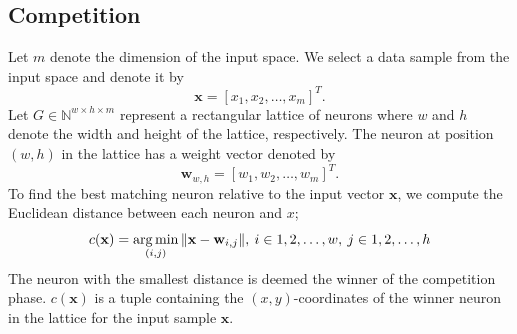 \documentclass[english]{lni}
\newcommand{\argmin}{\operatornamewithlimits{arg\,min}}
\begin{document}
\subsection{Competition}
Let $m$ denote the dimension of the input space.
We select a data sample from the input space and denote it by
\begin{equation}
    \mathbf{x} = [x_{1}, x_{2}, \hdots, x_{m}]^{T}.
\end{equation}
Let $G \in \mathbb{N}^{w \times h \times m}$ represent a rectangular lattice of neurons where $w$ and $h$ denote the width and height of the lattice, respectively.
The neuron at position $(w, h)$ in the lattice has a weight vector denoted by 
\begin{equation}
    \mathbf{w}_{w, h} = [w_{1}, w_{2}, \hdots, w_{m}]^{T}.
\end{equation}
To find the best matching neuron relative to the input vector $\mathbf{x}$, we 
compute the Euclidean distance between each neuron and $x$;
\begin{equation}
    \label{eq:min-dist}
    c(\mathbf{x}) = \argmin_{(i, j)}{\| \mathbf{x} - \mathbf{w}_{i, j}\|},  \:
    i \in {1, 2, \hdots, w},  \:
    j \in {1, 2, \hdots, h}
\end{equation}
The neuron with the smallest
distance is deemed the winner of the competition phase. 
${c(\mathbf{x})}$ is a tuple containing the $(x,y)$-coordinates of the winner 
neuron in the lattice for the input sample $\mathbf{x}$. 
\end{document}
